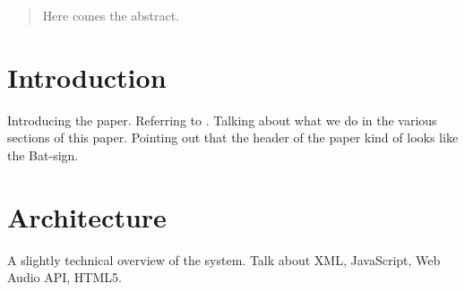 \documentclass{sig-alternate}
\begin{document}
\maketitle
\begin{abstract}
Here comes the abstract. 
\end{abstract}


\section{Introduction}
	Introducing the paper. Referring to \cite{waet}. Talking about what we do in the various sections of this paper. Pointing out that the header of the paper kind of looks like the Bat-sign. 
	
\section{Architecture}
	A slightly technical overview of the system. Talk about XML, JavaScript, Web Audio API, HTML5. 
	
\end{document}
